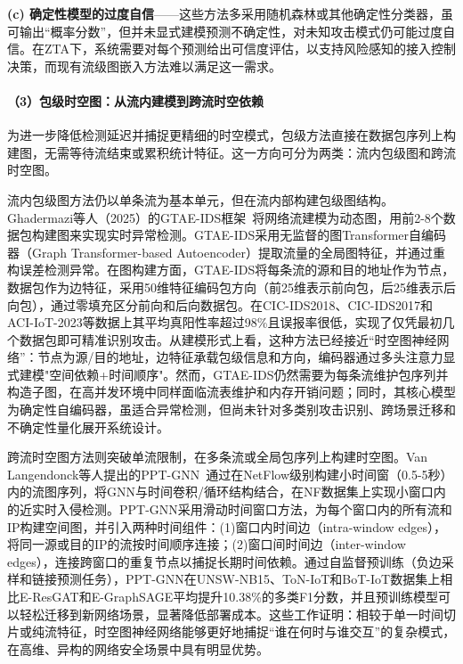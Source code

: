 \textbf{(c) 确定性模型的过度自信}——这些方法多采用随机森林或其他确定性分类器，虽可输出``概率分数''，但并未显式建模预测不确定性，对未知攻击模式仍可能过度自信。在ZTA下，系统需要对每个预测给出可信度评估，以支持风险感知的接入控制决策，而现有流级图嵌入方法难以满足这一需求。

\paragraph{（3）包级时空图：从流内建模到跨流时空依赖}


为进一步降低检测延迟并捕捉更精细的时空模式，包级方法直接在数据包序列上构建图，无需等待流结束或累积统计特征。这一方向可分为两类：流内包级图和跨流时空图。

流内包级图方法仍以单条流为基本单元，但在流内部构建包级图结构。Ghadermazi等人（2025）的GTAE-IDS框架~\cite{GTAE-IDS}将网络流建模为动态图，用前2-8个数据包构建图来实现实时异常检测。GTAE-IDS采用无监督的图Transformer自编码器（Graph Transformer-based Autoencoder）提取流量的全局图特征，并通过重构误差检测异常。在图构建方面，GTAE-IDS将每条流的源和目的地址作为节点，数据包作为边特征，采用50维特征编码包方向（前25维表示前向包，后25维表示后向包），通过零填充区分前向和后向数据包。在CIC-IDS2018、CIC-IDS2017和ACI-IoT-2023等数据上其平均真阳性率超过98\%且误报率很低，实现了仅凭最初几个数据包即可精准识别攻击。从建模形式上看，这种方法已经接近``时空图神经网络''：节点为源/目的地址，边特征承载包级信息和方向，编码器通过多头注意力显式建模"空间依赖+时间顺序"。然而，GTAE-IDS仍然需要为每条流维护包序列并构造子图，在高并发环境中同样面临流表维护和内存开销问题；同时，其核心模型为确定性自编码器，虽适合异常检测，但尚未针对多类别攻击识别、跨场景迁移和不确定性量化展开系统设计。

跨流时空图方法则突破单流限制，在多条流或全局包序列上构建时空图。Van Langendonck等人提出的PPT-GNN~\cite{PPT-GNN}通过在NetFlow级别构建小时间窗（0.5-5秒）内的流图序列，将GNN与时间卷积/循环结构结合，在NF数据集上实现小窗口内的近实时入侵检测。PPT-GNN采用滑动时间窗口方法，为每个窗口内的所有流和IP构建空间图，并引入两种时间组件：(1)窗口内时间边（intra-window edges），将同一源或目的IP的流按时间顺序连接；(2)窗口间时间边（inter-window edges），连接跨窗口的重复节点以捕捉长期时间依赖。通过自监督预训练（负边采样和链接预测任务），PPT-GNN在UNSW-NB15、ToN-IoT和BoT-IoT数据集上相比E-ResGAT和E-GraphSAGE平均提升10.38\%的多类F1分数，并且预训练模型可以轻松迁移到新网络场景，显著降低部署成本。这些工作证明：相较于单一时间切片或纯流特征，时空图神经网络能够更好地捕捉``谁在何时与谁交互''的复杂模式，在高维、异构的网络安全场景中具有明显优势。

